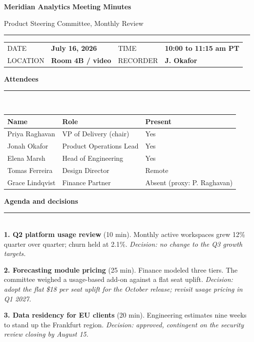 \documentclass[10pt]{article}
\newcommand{\sectionrule}[1]{%
  \vspace{14pt}
  {\large\bfseries\color{accent}#1}\\[-4pt]
  {\color{accent}\rule{\linewidth}{1pt}}\\[4pt]}
\begin{document}
{\LARGE\bfseries\color{accent}Meridian Analytics}\hfill
{\large\bfseries Meeting Minutes}

\vspace{4pt}
{\color{inkgray}\small Product Steering Committee, Monthly Review}

\vspace{6pt}
{\color{accent}\rule{\linewidth}{2pt}}

\vspace{10pt}
\begin{tabular}{@{}llll@{}}
  {\color{inkgray}\small DATE} & {\bfseries July 16, 2026} \hspace{18pt} &
  {\color{inkgray}\small TIME} & {\bfseries 10:00 to 11:15 am PT}\\[2pt]
  {\color{inkgray}\small LOCATION} & {\bfseries Room 4B / video} &
  {\color{inkgray}\small RECORDER} & {\bfseries J. Okafor}\\
\end{tabular}

\sectionrule{Attendees}

\begin{tabularx}{\textwidth}{@{}lXl@{}}
  \toprule
  \rowcolor{white}
  {\bfseries Name} & {\bfseries Role} & {\bfseries Present}\\
  \midrule
  Priya Raghavan & VP of Delivery (chair) & Yes\\
  Jonah Okafor & Product Operations Lead & Yes\\
  Elena Marsh & Head of Engineering & Yes\\
  Tomas Ferreira & Design Director & Remote\\
  Grace Lindqvist & Finance Partner & Absent (proxy: P. Raghavan)\\
  \bottomrule
\end{tabularx}

\sectionrule{Agenda and decisions}

{\bfseries 1. Q2 platform usage review} (10 min).
Monthly active workspaces grew 12\% quarter over quarter; churn held at
2.1\%. \textit{Decision: no change to the Q3 growth targets.}

{\bfseries 2. Forecasting module pricing} (25 min).
Finance modeled three tiers. The committee weighed a usage-based add-on
against a flat seat uplift. \textit{Decision: adopt the flat \$18 per seat
uplift for the October release; revisit usage pricing in Q1 2027.}

{\bfseries 3. Data residency for EU clients} (20 min).
Engineering estimates nine weeks to stand up the Frankfurt region.
\textit{Decision: approved, contingent on the security review closing by
August 15.}
\end{document}
